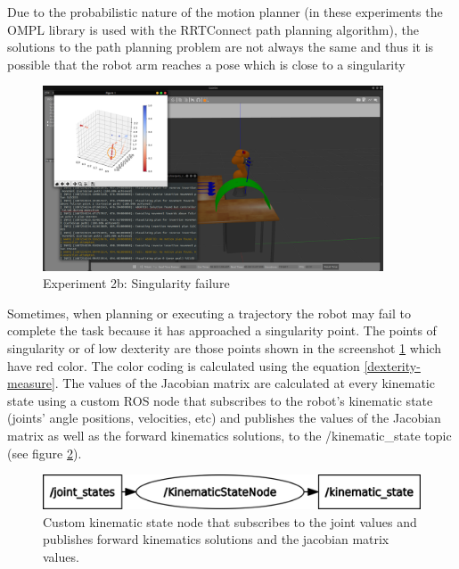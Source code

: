 Due to the probabilistic nature of the motion planner (in these experiments the OMPL library is used with the RRTConnect path planning algorithm), the solutions 
to the path planning problem are not always the same and thus it is possible that the robot arm reaches a pose which is close to a singularity
\begin{center}
\begin{figure}[H]
\centering
\includegraphics[width=0.9\textwidth]{images/robot_planner2b/singularity_failure.png}
\caption{Experiment 2b: Singularity failure}
\label{robot-planner2b-singularity-failure}
\end{figure}
\end{center}

Sometimes, when planning or executing a trajectory the robot may fail to complete the task because it has approached a singularity point. The points of singularity or of low dexterity are those points shown in the screenshot 
\ref{robot-planner2b-singularity-failure} which have red color. The color coding is calculated using the equation \ref{dexterity-measure}. The values of the Jacobian matrix are calculated at every kinematic state using 
a custom ROS node that subscribes to the robot's kinematic state (joints' angle positions, velocities, etc) and publishes the values of the Jacobian matrix as well as the forward kinematics solutions, to the 
/kinematic\_state topic (see figure \ref{kinematic-state-topic-graph}).

\begin{center}
\begin{figure}[H]
\centering
\includegraphics[width=\textwidth]{images/kinematic_state_topic_graph.png}
\caption{Custom kinematic state node that subscribes to the joint values and publishes forward kinematics solutions and the jacobian matrix values.}
\label{kinematic-state-topic-graph}
\end{figure}
\end{center}


